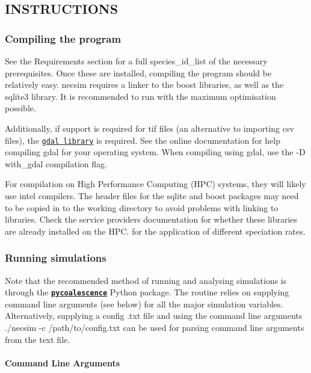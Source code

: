 \subsection*{I\+N\+S\+T\+R\+U\+C\+T\+I\+O\+NS}

\subsubsection*{Compiling the program}

See the Requirements section for a full species\+\_\+id\+\_\+list of the necessary prerequisites. Once these are installed, compiling the program should be relatively easy. necsim requires a linker to the boost libraries, as well as the sqlite3 library. It is recommended to run with the maximum optimisation possible.

Additionally, if support is required for tif files (an alternative to importing csv files), the \href{http://www.gdal.org/}{\tt gdal library} is required. See the online documentation for help compiling gdal for your operating system. When compiling using gdal, use the {\ttfamily -\/D with\+\_\+gdal} compilation flag.

For compilation on High Performance Computing (H\+PC) systems, they will likely use intel compilers. The header files for the sqlite and boost packages may need to be copied in to the working directory to avoid problems with linking to libraries. Check the service providers\textquotesingle{} documentation for whether these libraries are already installed on the H\+PC. for the application of different speciation rates.

\subsubsection*{Running simulations}

Note that the recommended method of running and analysing simulations is through the \href{https://pycoalescence.readthedocs.io}{\tt {\bfseries pycoalescence}} Python package. The routine relies on supplying command line arguments (see below) for all the major simulation variables. Alternatively, supplying a config .txt file and using the command line arguments {\ttfamily ./necsim -\/c /path/to/config.txt} can be used for parsing command line arguments from the text file.

\paragraph*{Command Line Arguments}

